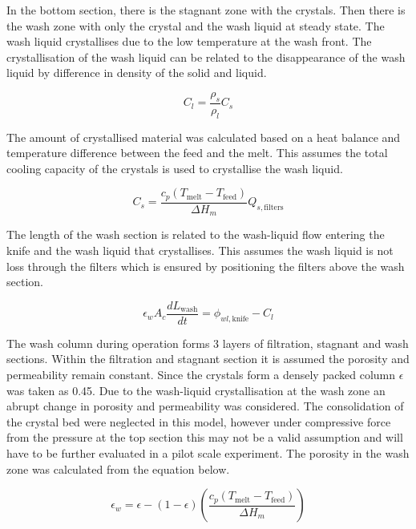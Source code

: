 In the bottom section, there is the stagnant zone with the crystals. Then there is the wash zone with only the crystal and the wash liquid at steady state. The wash liquid crystallises due to the low temperature at the wash front. The crystallisation of the wash liquid can be related to the disappearance of the wash liquid by difference in density of the solid and liquid.

\begin{equation}
C_l= \frac{\rho_s}{\rho_l}C_s
\end{equation}

The amount of crystallised material was calculated based on a heat balance and temperature difference between the feed and the melt. This assumes the total cooling capacity of the crystals is used to crystallise the wash liquid. 

\begin{equation}
C_s= \frac{c_p(T_{\mathrm{melt}}-T_{\mathrm{feed}})}{\Delta H_m}Q_{s,\mathrm{filters}}
\end{equation}

The length of the wash section is related to the wash-liquid flow entering the knife and the wash liquid that crystallises. This assumes the wash liquid is not loss through the filters which is ensured by positioning the filters above the wash section.

\begin{equation}
\epsilon_w A_c \frac{dL_{\mathrm{wash}}}{dt}= \phi_{wl,\mathrm{knife}}-C_l
\end{equation}

The wash column during operation forms 3 layers of filtration, stagnant and wash sections. Within the filtration and stagnant section it is assumed the porosity and permeability remain constant. Since the crystals form a densely packed column $\epsilon$ was taken as 0.45. Due to the wash-liquid crystallisation at the wash zone an abrupt change in porosity and permeability was considered. The consolidation of the crystal bed were neglected in this model, however under compressive force from the pressure at the top section this may not be a valid assumption and will have to be further evaluated in a pilot scale experiment. The porosity in the wash zone was calculated from the equation below. 

\begin{equation}
\epsilon_{w}= \epsilon-(1-\epsilon)\left(\frac{c_p(T_{\mathrm{melt}}-T_{\mathrm{feed}})}{\Delta H_m}\right)
\end{equation}

